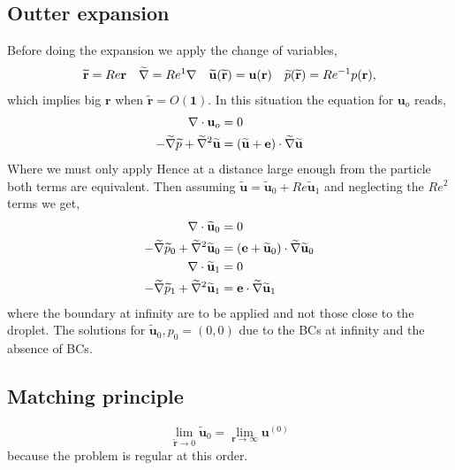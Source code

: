 \subsection{Outter expansion}
Before doing the expansion we apply the change of variables,
\begin{align}
    \widetilde{\textbf{r}} = Re \textbf{r}
    && \widetilde{\mathbf{\nabla}} = Re^{1} \mathbf{\nabla}
    && \widetilde{\textbf{u}}(\widetilde{\textbf{r}}) = \textbf{u}(\textbf{r})
    && \widetilde{p}(\widetilde{\textbf{r}}) = Re^{-1} p(\textbf{r}),
\end{align}
which implies big $\textbf{r}$ when $\widetilde{\textbf{r}} = O(\textbf{1})$.
In this situation the equation for $\textbf{u}_o$ reads,
\begin{align}
    \mathbf{\nabla}\cdot \textbf{u}_{o} &= 0
    \\
    - \widetilde{\mathbf{\nabla}} \widetilde{p} +  \widetilde{\mathbf{\nabla}}^2 \widetilde{\textbf{u}}
    &=
      (\widetilde{\textbf{u}} + \textbf{e})\cdot \widetilde{\mathbf{\nabla}} \widetilde{\textbf{u}}
\end{align}
Where we must only apply
Hence at a distance large enough from the particle both terms are equivalent.
Then assuming $\widetilde{\textbf{u}} = \widetilde{\textbf{u}}_0 + Re\widetilde{\textbf{u}}_1$ and neglecting the $Re^2$ terms we get,
\begin{align}
    \mathbf{\nabla}\cdot \widetilde{\textbf{u}}_0 &= 0
    \\
    - \widetilde{\mathbf{\nabla}} \widetilde{p}_0 +  \widetilde{\mathbf{\nabla}}^2 \widetilde{\textbf{u}}_0
    &=
     (\textbf{e}+ \widetilde{\textbf{u}}_0) \cdot \widetilde{\mathbf{\nabla}} \widetilde{\textbf{u}}_0\\
    \mathbf{\nabla}\cdot \widetilde{\textbf{u}}_1 &= 0
    \\
    - \widetilde{\mathbf{\nabla}} \widetilde{p}_1 +  \widetilde{\mathbf{\nabla}}^2 \widetilde{\textbf{u}}_1
    &=
     \textbf{e} \cdot \widetilde{\mathbf{\nabla}} \widetilde{\textbf{u}}_1
\end{align}
where the boundary at infinity are to be applied and not those close to the droplet.
The solutions for $\widetilde{\textbf{u}}_0, p_0 = (0,0)$ due to the BCs at infinity and the absence of BCs.
\subsection{Matching principle}
\begin{equation}
    \lim_{\widetilde{\textbf{r}}\to 0} \widetilde{\textbf{u}}_0
    = \lim_{\textbf{r}\to \infty} \textbf{u}^{(0)}
\end{equation}
because the problem is regular at this order.

